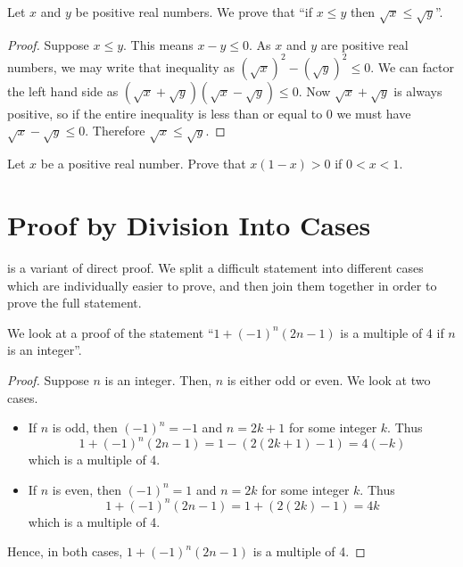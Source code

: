 \begin{example}
    Let $x$ and $y$ be positive real numbers. We prove that ``if $x \leq y$ then $\sqrt x \leq \sqrt y$''.
    \begin{proof}
        Suppose $x \leq y$. This means $x - y \leq 0$. As $x$ and $y$ are positive real numbers, we may write that inequality as $(\sqrt x)^2 - (\sqrt y)^2 \leq 0$. We can factor the left hand side as $(\sqrt x + \sqrt y)(\sqrt x - \sqrt y) \leq 0$. Now $\sqrt x + \sqrt y$ is always positive, so if the entire inequality is less than or equal to 0 we must have $\sqrt x - \sqrt y \leq 0$. Therefore $\sqrt x \leq \sqrt y$.
    \end{proof}
\end{example}

\begin{exercise}
    Let $x$ be a positive real number. Prove that $x(1-x) > 0$ if $0 < x < 1$.
\end{exercise}

\section{Proof by Division Into Cases}
 is a variant of direct proof. We split a difficult statement into different cases which are individually easier to prove, and then join them together in order to prove the full statement.

\begin{example}
    We look at a proof of the statement ``$1 + (-1)^n(2n-1)$ is a multiple of 4 if $n$ is an integer''.
    \begin{proof}
        Suppose $n$ is an integer. Then, $n$ is either odd or even. We look at two cases.
        \begin{itemize}
            \item If $n$ is odd, then $(-1)^n = -1$ and $n = 2k+1$ for some integer $k$. Thus
            \[
                1 + (-1)^n(2n-1) = 1 - (2(2k+1)-1) = 4(-k)
            \]
            which is a multiple of 4.
            \item If $n$ is even, then $(-1)^n = 1$ and $n = 2k$ for some integer $k$. Thus
            \[
                1 + (-1)^n(2n-1) = 1 + (2(2k)-1) = 4k
            \]
            which is a multiple of 4.
        \end{itemize}
        Hence, in both cases, $1 + (-1)^n(2n-1)$ is a multiple of 4.
    \end{proof}
\end{example}

